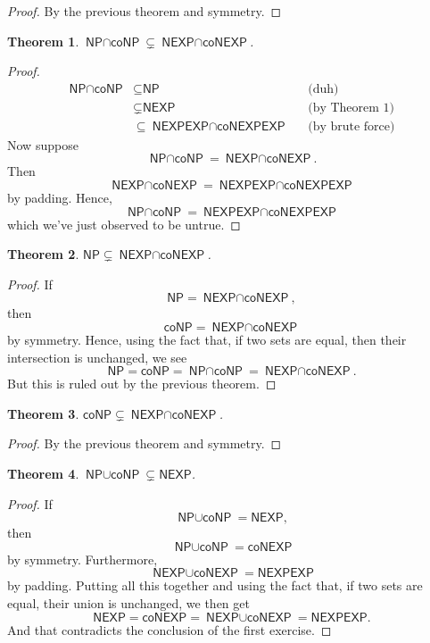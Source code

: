 \documentclass{article}
\newtheorem{theorem}{Theorem}
\newcommand{\NP}{\ensuremath{\textsf{NP}}}
\newcommand{\NEXP}{\ensuremath{\textsf{NEXP}}}
\newcommand{\NEXPEXP}{\ensuremath{\textsf{NEXPEXP}}}
\newcommand{\coNP}{\ensuremath{\textsf{coNP}}}
\newcommand{\coNEXP}{\ensuremath{\textsf{coNEXP}}}
\newcommand{\interP}{\ensuremath{\textsf{NP}\cap\textsf{coNP}}}
\newcommand{\interEXP}{\ensuremath{\textsf{NEXP}\cap\textsf{coNEXP}}}
\newcommand{\interEXPEXP}{\ensuremath{\textsf{NEXPEXP}\cap\textsf{coNEXPEXP}}}
\newcommand{\unionP}{\ensuremath{\textsf{NP}\cup\textsf{coNP}}}
\newcommand{\unionEXP}{\ensuremath{\textsf{NEXP}\cup\textsf{coNEXP}}}
\newcounter{exercise}
\begin{document}
\begin{proof}
By the previous theorem and symmetry.
\end{proof}

\begin{theorem}
$\interP \subsetneq \interEXP$.
\end{theorem}

\begin{proof}
\[
\begin{aligned}
\interP & \subseteq \NP & & \text{(duh)}\\
& \subsetneq \NEXP & & \text{(by Theorem 1)}\\
& \subseteq \interEXPEXP & & \text{(by brute force)}
\end{aligned}
\]
Now suppose
\[
\interP = \interEXP.
\]
Then
\[
\interEXP = \interEXPEXP
\]
by padding. Hence,
\[
\interP = \interEXPEXP
\]
which we've just observed to be untrue. \lightning
\end{proof}

\begin{theorem}
$\NP \subsetneq \interEXP$.
\end{theorem}

\begin{proof}
If
\[
\NP = \interEXP,
\]
then
\[
\coNP = \interEXP
\]
by symmetry. Hence, using the fact that, if two sets are equal, then their intersection is unchanged, we see
\[
\NP = \coNP = \interP = \interEXP.
\]
But this is ruled out by the previous theorem. \lightning
\end{proof}

\begin{theorem}
$\coNP \subsetneq \interEXP$.
\end{theorem}

\begin{proof}
By the previous theorem and symmetry.
\end{proof}

\begin{theorem}
$\unionP \subsetneq \NEXP$.
\end{theorem}

\begin{proof}
If
\[
\unionP = \NEXP,
\]
then
\[
\unionP = \coNEXP
\]
by symmetry. Furthermore,
\[
\unionEXP = \NEXPEXP
\]
by padding. Putting all this together and using the fact that, if two sets are equal, their union is unchanged, we then get
\[
\NEXP = \coNEXP = \unionEXP = \NEXPEXP.
\]
And that contradicts the conclusion of the first exercise. \lightning
\end{proof}
\end{document}
